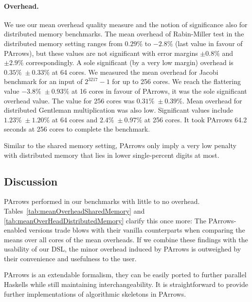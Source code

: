 \documentclass{jfp1}
\begin{document}
\paragraph{Overhead.}
We use our mean overhead quality measure and the notion of significance also for distributed memory benchmarks. The mean overhead of Rabin-Miller test in the distributed memory setting ranges from $0.29\%$ to $-2.8\%$ (last value in favour of PArrows), but these values are not significant with error margins $\pm 0.8\%$ and $\pm 2.9\%$ correspondingly. A sole significant (by a very low margin) overhead is $0.35\% \; \pm 0.33\%$ at 64 cores.
We measured the mean overhead for Jacobi benchmark for an input of $2^{3217}-1$ for up to 256 cores.
We reach the flattering value $-3.8\% \; \pm 0.93\%$ at 16 cores in favour of PArrows, it was the sole significant overhead value. The  value for 256 cores was $0.31\% \; \pm 0.39\%$.
Mean overhead for distributed Gentleman multiplication was also low. Significant values include $1.23\% \; \pm 1.20\%$ at 64 cores and $2.4\% \; \pm 0.97\%$ at 256 cores. It took PArrows 64.2 seconds at 256 cores to complete the benchmark.

Similar to the shared memory setting, PArrows only imply a very low penalty with distributed memory that lies in lower single-percent digits at most.

\subsection{Discussion}


PArrows performed in our benchmarks with little to no overhead. Tables~\ref{tab:meanOverheadSharedMemory} and \ref{tab:meanOverHeadDistributedMemory} clarify this once more: The PArrows-enabled versions trade blows with their vanilla counterparts when comparing the means over all cores of the mean overheads. If we combine these findings with the usability of our DSL,
the minor overhead induced by PArrows is outweighed by their convenience and usefulness to the user.

PArrows is an extendable formalism, they can be easily ported to further parallel Haskells while still maintaining interchangeability. It is straightforward to provide further implementations of algorithmic skeletons in PArrows.
	
\end{document}
